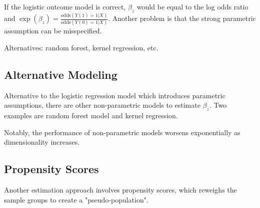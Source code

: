 If the logistic outcome model is correct, $\beta_z$ would be equal to the log odds ratio and $\exp(\beta_z) = \frac{\text{odds}(Y(1) = 1 | X)}{\text{odds}(Y(0) = 1 | X)}$. Another problem is that the strong parametric assumption can be misspecified. 

Alternatives: random forest, kernel regression, etc.


\subsection{Alternative Modeling}

Alternative to the logistic regression model which introduces parametric assumptions, there are other non-parametric models to estimate \(\beta_z\). Two examples are random forest model and kernel regression.

\begin{table}[h!]
\centering
{}
\caption{Comparison of Parametric and Non-Parametric Models}
\end{table}

Notably, the performance of non-parametric models worsens exponentially as dimensionality increases.

\subsection{Propensity Scores}
Another estimation approach involves propensity scores, which reweighs the sample groups to create a "pseudo-population".

